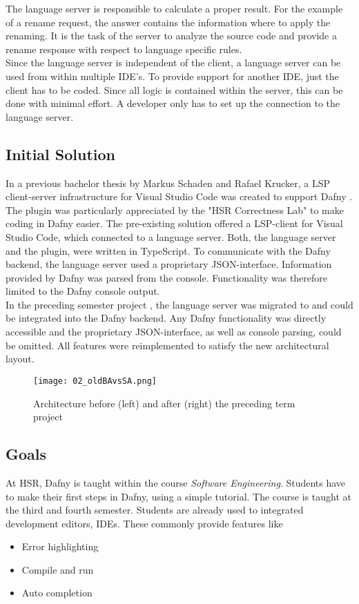 The language server is responsible to calculate a proper result.
For the example of a rename request, the answer contains the information where to apply the renaming.
It is the task of the server to analyze the source code and provide a rename response with respect to language specific rules.\\

Since the language server is independent of the client, a language server can be used from within multiple IDE's.
To provide support for another IDE, just the client has to be coded.
Since all logic is contained within the server, this can be done with minimal effort.
A developer only has to set up the connection to the language server.



\subsection{Initial Solution}
\label{section:managment_summary:initialsolution}
In a previous bachelor thesis by Markus Schaden and Rafael Krucker, a LSP client-server infrastructure for Visual Studio Code was created to support Dafny \cite{ba}.
The plugin was particularly appreciated by the "HSR Correctness Lab" \cite{correctnessLab} to make coding in Dafny easier.
The pre-existing solution offered a LSP-client for Visual Studio Code, which connected to a language server.
Both, the language server and the plugin, were written in TypeScript.
To communicate with the Dafny backend, the language server used a proprietary JSON-interface.
Information provided by Dafny was parsed from the console.
Functionality was therefore limited to the Dafny console output.\\
In the preceding semester project \cite{sa}, the language server was migrated to \CsharpWithSpace and could be integrated into the Dafny backend.
Any Dafny functionality was directly accessible and the proprietary JSON-interface, as well as console parsing, could be omitted.
All features were reimplemented to satisfy the new architectural layout.

\begin{figure}[h]
    \centering
    \texttt{[image: 02\_oldBAvsSA.png]}
    \caption{Architecture before (left) and after (right) the preceding term project}
    \label{fig:oldBAvsSA}
\end{figure}


\subsection{Goals}
At HSR, Dafny is taught within the course \textit{Software Engineering}.
Students have to make their first steps in Dafny, using a simple tutorial.
The course is taught at the third and fourth semester.
Students are already used to integrated development editors, IDEs.
These commonly provide features like
\begin{itemize}
    \item Error highlighting
    \item Compile and run
    \item Auto completion
\end{itemize}

